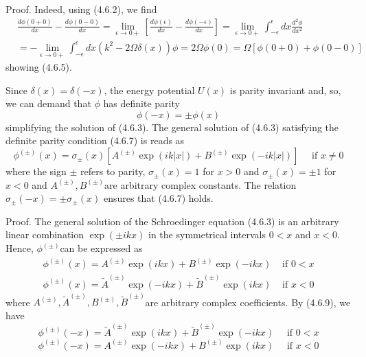 \documentclass{article}
\begin{document}
Proof. Indeed, using (4.6.2), we find
$$
\begin{align*}
& \frac{d \phi(0+0)}{d x}-\frac{d \phi(0-0)}{d x}=\lim _{\epsilon \rightarrow 0+}\left[\frac{d \phi(\epsilon)}{d x}-\frac{d \phi(-\epsilon)}{d x}\right]=\lim _{\epsilon \rightarrow 0+} \int_{-\epsilon}^{\epsilon} d x \frac{d^{2} \phi}{d x^{2}}  \tag{4.6.6}\\
& =-\lim _{\epsilon \rightarrow 0+} \int_{-\epsilon}^{\epsilon} d x\left(k^{2}-2 \Omega \delta(x)\right) \phi=2 \Omega \phi(0)=\Omega[\phi(0+0)+\phi(0-0)]
\end{align*}
$$
showing (4.6.5).

Since $\delta(x)=\delta(-x)$, the energy potential $U(x)$ is parity invariant and, so, we can demand that $\phi$ has definite parity
$$
\begin{equation*}
\phi(-x)= \pm \phi(x) \tag{4.6.7}
\end{equation*}
$$
simplifying the solution of (4.6.3).
The general solution of (4.6.3) satisfying the definite parity condition (4.6.7) is reads as
$$
\begin{equation*}
\phi^{( \pm)}(x)=\sigma_{ \pm}(x)\left[A^{( \pm)} \exp (i k|x|)+B^{( \pm)} \exp (-i k|x|)\right] \quad \text { if } x \neq 0 \tag{4.6.8}
\end{equation*}
$$
where the sign $\pm$ refers to parity, $\sigma_{ \pm}(x)=1$ for $x>0$ and $\sigma_{ \pm}(x)= \pm 1$ for $x<0$ and $A^{( \pm)}, B^{( \pm)}$are arbitrary complex constants. The relation $\sigma_{ \pm}(-x)= \pm \sigma_{ \pm}(x)$ ensures that (4.6.7) holds.

Proof. The general solution of the Schroedinger equation (4.6.3) is an arbitrary linear combination $\exp ( \pm i k x)$ in the symmetrical intervals $0<x$ and $x<0$. Hence, $\phi^{( \pm)}$can be expressed as
$$
\begin{array}{ll}
\phi^{( \pm)}(x)=A^{( \pm)} \exp (i k x)+B^{( \pm)} \exp (-i k x) & \text { if } 0<x \\
\phi^{( \pm)}(x)=\tilde{A}^{( \pm)} \exp (-i k x)+\tilde{B}^{( \pm)} \exp (i k x) & \text { if } x<0 \tag{4.6.9~b}
\end{array}
$$
where $A^{( \pm)}, \tilde{A}^{( \pm)}, B^{( \pm)}, \tilde{B}^{( \pm)}$are arbitrary complex coefficients. By (4.6.9), we have
$$
\begin{equation*}
\phi^{( \pm)}(-x)=\tilde{A}^{( \pm)} \exp (i k x)+\tilde{B}^{( \pm)} \exp (-i k x) \quad \text { if } 0<x \tag{4.6.10a}
\end{equation*}
$$
$$
\begin{equation*}
\phi^{( \pm)}(-x)=A^{( \pm)} \exp (-i k x)+B^{( \pm)} \exp (i k x) \quad \text { if } x<0 \tag{4.6.10b}
\end{equation*}
$$
\end{document}
